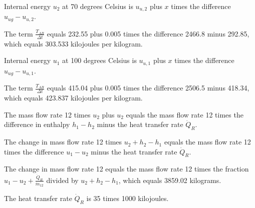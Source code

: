 Internal energy \( u_2 \) at 70 degrees Celsius is \( u_{u,2} \) plus \( x \) times the difference \( u_{ug} - u_{u,2} \).

The term \( \frac{T_{AB}}{\Delta t} \) equals 232.55 plus 0.005 times the difference 2466.8 minus 292.85, which equals 303.533 kilojoules per kilogram.

Internal energy \( u_1 \) at 100 degrees Celsius is \( u_{u,1} \) plus \( x \) times the difference \( u_{ug} - u_{u,1} \).

The term \( \frac{T_{AB}}{\Delta t} \) equals 415.04 plus 0.005 times the difference 2506.5 minus 418.34, which equals 423.837 kilojoules per kilogram.

The mass flow rate 12 times \( u_2 \) plus \( u_2 \) equals the mass flow rate 12 times the difference in enthalpy \( h_1 - h_2 \) minus the heat transfer rate \( \dot{Q}_R \).

The change in mass flow rate 12 times \( u_2 + h_2 - h_1 \) equals the mass flow rate 12 times the difference \( u_1 - u_2 \) minus the heat transfer rate \( \dot{Q}_R \).

The change in mass flow rate 12 equals the mass flow rate 12 times the fraction \( u_1 - u_2 + \frac{\dot{Q}_R}{\dot{m}_{12}} \) divided by \( u_2 + h_2 - h_1 \), which equals 3859.02 kilograms.

The heat transfer rate \( \dot{Q}_R \) is 35 times 1000 kilojoules.
